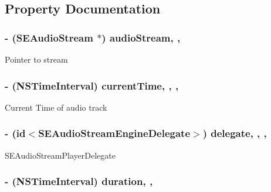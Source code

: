 \subsection{Property Documentation}
\hypertarget{interface_s_e_audio_stream_engine_abe299880b85d0e7df2a9a2c6b6307dc3}{
\subsubsection[{audio\-Stream}]{\setlength{\rightskip}{0pt plus 5cm}-\/ ({\bf S\-E\-Audio\-Stream} $\ast$) audio\-Stream\hspace{0.3cm}{\ttfamily [read]}, {\ttfamily [nonatomic]}, {\ttfamily [assign]}}}\label{interface_s_e_audio_stream_engine_abe299880b85d0e7df2a9a2c6b6307dc3}
Pointer to stream \hypertarget{interface_s_e_audio_stream_engine_ad7b5146644d4e96003f18756c4de975e}{
\subsubsection[{current\-Time}]{\setlength{\rightskip}{0pt plus 5cm}-\/ (N\-S\-Time\-Interval) current\-Time\hspace{0.3cm}{\ttfamily [read]}, {\ttfamily [write]}, {\ttfamily [nonatomic]}, {\ttfamily [assign]}}}\label{interface_s_e_audio_stream_engine_ad7b5146644d4e96003f18756c4de975e}
Current Time of audio track \hypertarget{interface_s_e_audio_stream_engine_a83d462c8d145871aff485cc4dec5f9a5}{
\subsubsection[{delegate}]{\setlength{\rightskip}{0pt plus 5cm}-\/ (id$<${\bf S\-E\-Audio\-Stream\-Engine\-Delegate}$>$) delegate\hspace{0.3cm}{\ttfamily [read]}, {\ttfamily [write]}, {\ttfamily [nonatomic]}, {\ttfamily [weak]}}}\label{interface_s_e_audio_stream_engine_a83d462c8d145871aff485cc4dec5f9a5}
S\-E\-Audio\-Stream\-Player\-Delegate \hypertarget{interface_s_e_audio_stream_engine_a9b03bb707f1b187e2d32e540f80a5dc1}{
\subsubsection[{duration}]{\setlength{\rightskip}{0pt plus 5cm}-\/ (N\-S\-Time\-Interval) duration\hspace{0.3cm}{\ttfamily [read]}, {\ttfamily [nonatomic]}, {\ttfamily [assign]}}}\label{interface_s_e_audio_stream_engine_a9b03bb707f1b187e2d32e540f80a5dc1}
